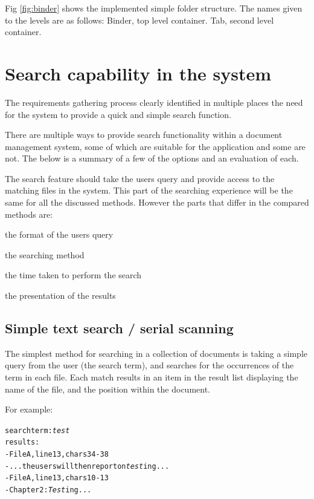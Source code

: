 Fig \ref{fig:binder} shows the implemented simple folder structure. The names given to the levels are as follows: Binder, top level container. Tab, second level container.

\section{Search capability in the system}\label{search-capability-in-the-system}

The requirements gathering process clearly identified in multiple places the
need for the system to provide a quick and simple search function.

There are multiple ways to provide search functionality within a document
management system, some of which are suitable for the application and some are
not. The below is a summary of a few of the options and an evaluation of each.

The search feature should take the users query and provide access to the
matching files in the system. This part of the searching experience will be the
same for all the discussed methods. However the parts that differ in the
compared methods are:
\begin{list}
  \item the format of the users query
  \item the searching method
  \item the time taken to perform the search
  \item the presentation of the results
\end{list}

\subsection{Simple text search / serial scanning}%
\label{simple-text-search-serial-scanning}

The simplest method for searching in a collection of documents is taking a
simple query from the user (the search term), and searches for the occurrences
of the term in each file. Each match results in an item in the result list
displaying the name of the file, and the position within the document.

For example:

\begin{alltt}
    search term: \emph{test}
    results:
    - File A, line 13, chars 34-38
      - ... the users will then report on \emph{test}ing ...
    - File A, line 13, chars 10-13
      - Chapter 2: \emph{Test}ing ...
\end{alltt}

